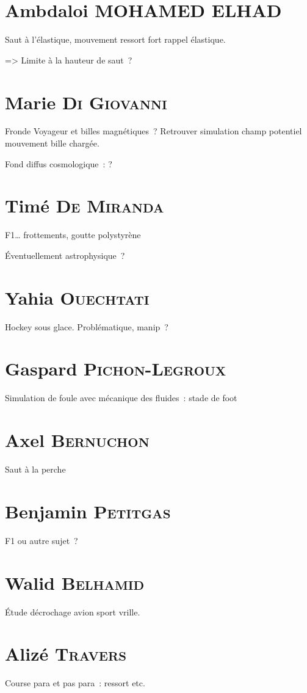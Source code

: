 \documentclass[a4paper, 11pt, final, garamond]{book}
\begin{document}
\section{Ambdaloi \textsc{MOHAMED ELHAD}}
Saut à l'élastique, mouvement ressort fort rappel élastique.

=> Limite à la hauteur de saut~?

\section{Marie \textsc{Di Giovanni}}
Fronde Voyageur et billes magnétiques~? Retrouver simulation champ potentiel
mouvement bille chargée.

Fond diffus cosmologique~: ?

\section{Timé \textsc{De Miranda}}
F1… frottements, goutte polystyrène

Éventuellement astrophysique~? 

\section{Yahia \textsc{Ouechtati}}
Hockey sous glace. Problématique, manip~?

\section{Gaspard \textsc{Pichon-Legroux}}
Simulation de foule avec mécanique des fluides~: stade de foot

\section{Axel \textsc{Bernuchon}}
Saut à la perche

\section{Benjamin \textsc{Petitgas}}
F1 ou autre sujet~?

\section{Walid \textsc{Belhamid}}
Étude décrochage avion sport vrille.

\section{Alizé \textsc{Travers}}
Course para et pas para~: ressort etc.
\end{document}
